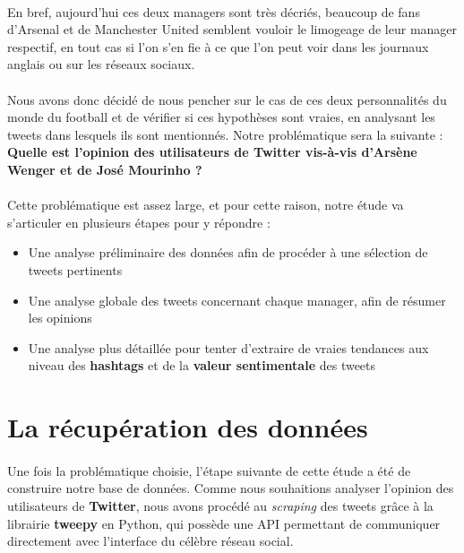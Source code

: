 \documentclass[14pt, openany]{article}
\begin{document}
\paragraph{}
En bref, aujourd'hui ces deux managers sont très décriés, beaucoup de fans d'Arsenal et de Manchester United semblent vouloir le limogeage de leur manager respectif, en tout cas si l'on s'en fie à ce que l'on peut voir dans les journaux anglais ou sur les réseaux sociaux.
\paragraph{}
Nous avons donc décidé de nous pencher sur le cas de ces deux personnalités du monde du football et de vérifier si ces hypothèses sont vraies, en analysant les tweets dans lesquels ils sont mentionnés. Notre problématique sera la suivante : \textbf{Quelle est l'opinion des utilisateurs de Twitter vis-à-vis d'Arsène Wenger et de José Mourinho ?}
\paragraph{}
Cette problématique est assez large, et pour cette raison, notre étude va s'articuler en plusieurs étapes pour y répondre :
\begin{itemize}
\item Une analyse préliminaire des données afin de procéder à une sélection de tweets pertinents
\item Une analyse globale des tweets concernant chaque manager, afin de résumer les opinions
\item Une analyse plus détaillée pour tenter d'extraire de vraies tendances aux niveau des \textbf{hashtags} et de la \textbf{valeur sentimentale} des tweets
\end{itemize}
\newpage
\section{La récupération des données}
\paragraph{}
Une fois la problématique choisie, l'étape suivante de cette étude a été de construire notre base de données. Comme nous souhaitions analyser l'opinion des utilisateurs de \textbf{Twitter}, nous avons procédé au \textit{scraping} des tweets grâce à la librairie \textbf{tweepy} en Python, qui possède une API permettant de communiquer directement avec l'interface du célèbre réseau social.
\end{document}
